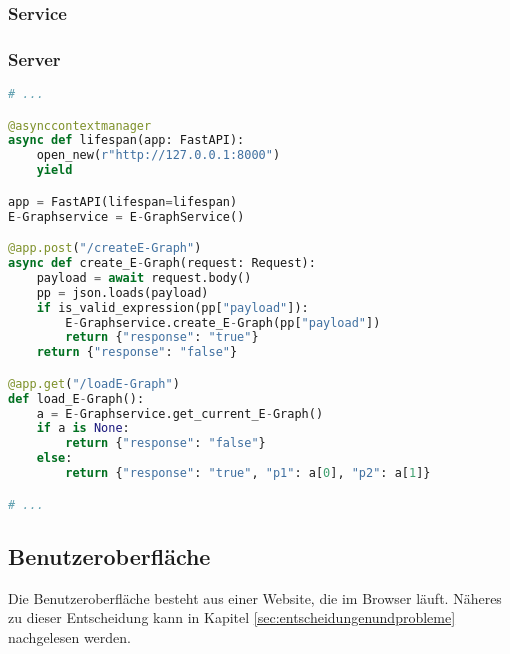 \subsubsection{Service}





\subsubsection{Server}

\begin{lstlisting}[language=Python, caption=Auszug aus der Datei \textit{server.py}]
# ... 

@asynccontextmanager
async def lifespan(app: FastAPI):
    open_new(r"http://127.0.0.1:8000")
    yield

app = FastAPI(lifespan=lifespan)
E-Graphservice = E-GraphService()

@app.post("/createE-Graph")
async def create_E-Graph(request: Request):
    payload = await request.body()
    pp = json.loads(payload)
    if is_valid_expression(pp["payload"]):
        E-Graphservice.create_E-Graph(pp["payload"])
        return {"response": "true"}
    return {"response": "false"}

@app.get("/loadE-Graph")
def load_E-Graph():
    a = E-Graphservice.get_current_E-Graph()
    if a is None:
        return {"response": "false"}
    else:
        return {"response": "true", "p1": a[0], "p2": a[1]}

# ... 
\end{lstlisting} 


\subsection{Benutzeroberfläche}

Die Benutzeroberfläche besteht aus einer Website, die im Browser läuft. Näheres zu dieser Entscheidung kann in Kapitel \ref{sec:entscheidungenundprobleme} nachgelesen werden.




